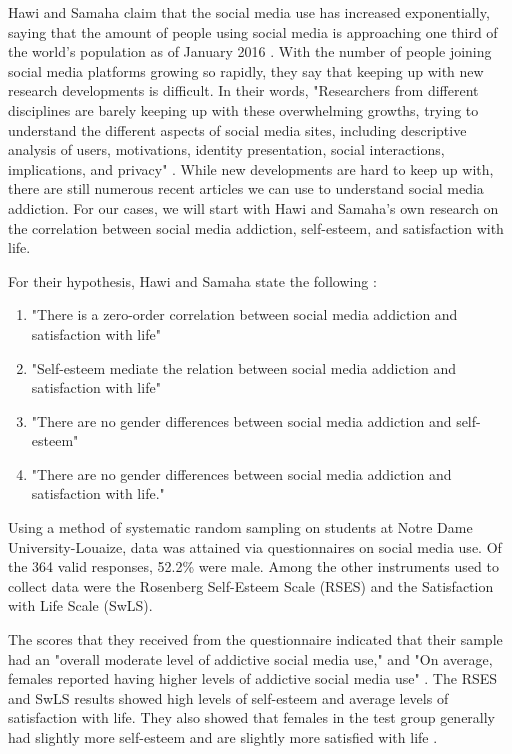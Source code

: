 \documentclass[12pt, journal, compsoc]{IEEEtran}
\begin{document}
Hawi and Samaha claim that the social media use has increased exponentially, saying that the amount of people using social media is approaching one third of the world's population as of January 2016 \cite{UniversityStudents}. With the number of people joining social media platforms growing so rapidly, they say that keeping up with new research developments is difficult. In their words, "Researchers from different disciplines are barely keeping up with these overwhelming growths, trying to understand the different aspects of social media sites, including descriptive analysis of users, motivations, identity presentation, social interactions, implications, and privacy" \cite{UniversityStudents}. While new developments are hard to keep up with, there are still numerous  recent articles we can use to understand social media addiction. For our cases, we will start with Hawi and Samaha's own research on the correlation between social media addiction, self-esteem, and satisfaction with life.

For their hypothesis, Hawi and Samaha state the following \cite{UniversityStudents}:
\begin{enumerate}
    \item "There is a zero-order correlation between social media addiction and satisfaction with life"
    \item "Self-esteem mediate the relation between social media addiction and satisfaction with life"
    \item "There are no gender differences between social media addiction and self-esteem"
    \item "There are no gender differences between social media addiction and satisfaction with life."
\end{enumerate}

Using a method of systematic random sampling on students at Notre Dame University-Louaize, data was attained via questionnaires on social media use. Of the 364 valid responses, 52.2\% were male. Among the other instruments used to collect data were the Rosenberg Self-Esteem Scale (RSES) and the Satisfaction with Life Scale (SwLS). 

The scores that they received from the questionnaire indicated that their sample had an "overall moderate level of addictive social media use," and "On average, females reported having higher levels of addictive social media use" \cite{UniversityStudents}. The RSES and SwLS results showed high levels of self-esteem and average levels of satisfaction with life. They also showed that females in the test group generally had slightly more self-esteem and are slightly more satisfied with life \cite{UniversityStudents}.
\end{document}
